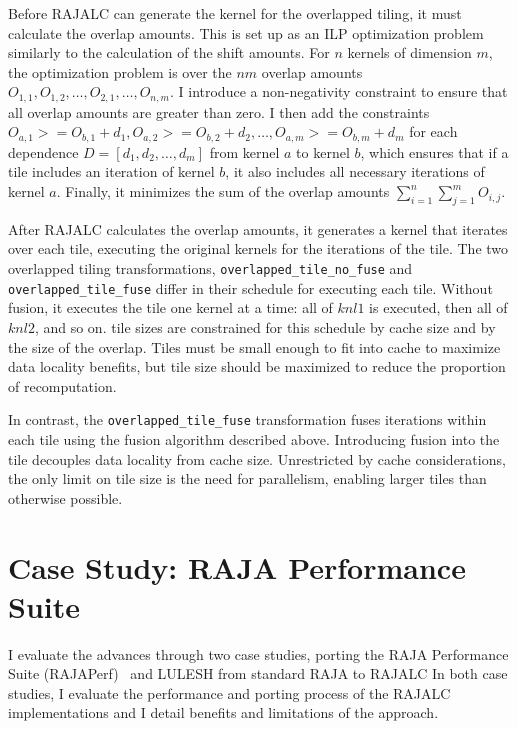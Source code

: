 Before RAJALC can generate the kernel for the overlapped tiling, it must
calculate the overlap amounts. 
This is set up as an ILP optimization problem similarly to the calculation of the
shift amounts.
For $n$ kernels of dimension $m$, the optimization problem is over the $nm$
overlap amounts $O_{1,1},O_{1,2},\ldots,O_{2,1},\ldots,O_{n,m}$.
I introduce a non-negativity constraint to ensure that all overlap amounts
are greater than zero. 
I then add the constraints
$O_{a,1} >= O_{b,1} + d_{1}, O_{a,2} >= O_{b,2} + d_{2},\ldots,O_{a,m} >= O_{b,m} + d_{m}$
for each dependence $D=[d_{1},d_{2},\ldots,d_{m}]$ from kernel $a$ to kernel $b$,
which ensures that if a tile includes an iteration of kernel $b$, it also
includes all necessary iterations of kernel $a$.
Finally, it minimizes the sum of the overlap amounts
$\sum_{i=1}^{n} \sum_{j=1}^{m} O_{i,j}$.

After RAJALC calculates the overlap amounts, it generates a kernel that iterates
over each tile, executing the original kernels for the iterations of the tile.
The two overlapped tiling transformations, \verb.overlapped_tile_no_fuse.
and \verb.overlapped_tile_fuse. differ in their schedule for executing each
tile.
Without fusion, it executes the tile one kernel at a time: all of $knl1$ is
executed, then all of $knl2$, and so on. 
tile sizes are constrained for this schedule by cache size and by the size of
the overlap. 
Tiles must be small enough to fit into cache to maximize data locality
benefits, but tile size should be maximized to reduce the proportion of
recomputation.

In contrast, the \verb.overlapped_tile_fuse. transformation fuses iterations
within each tile using the fusion algorithm described above.
Introducing fusion into the tile decouples data locality from cache size.
Unrestricted by cache considerations, the only limit on tile size is the
need for parallelism, enabling larger tiles than otherwise possible.

\section{Case Study: RAJA Performance Suite}

I evaluate the advances through two case studies, porting the RAJA
Performance Suite (RAJAPerf)~\cite{hornung2017raja} and  LULESH from
standard RAJA to RAJALC\@
In both case studies, I evaluate the performance and porting process
of the RAJALC implementations and I detail benefits and limitations
of the approach.

